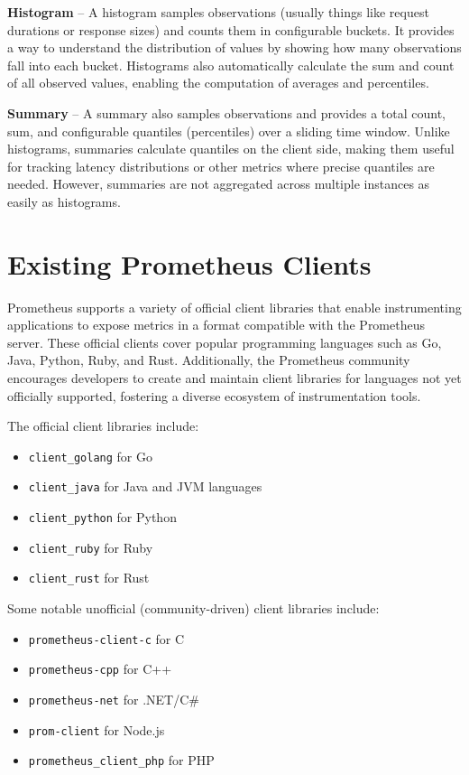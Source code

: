 \textbf{Histogram} – A histogram samples observations (usually things like request durations or response sizes) and counts them in configurable buckets.
It provides a way to understand the distribution of values by showing how many observations fall into each bucket.
Histograms also automatically calculate the sum and count of all observed values, enabling the computation of averages and percentiles.

\textbf{Summary} – A summary also samples observations and provides a total count, sum, and configurable quantiles (percentiles) over a sliding time window.
Unlike histograms, summaries calculate quantiles on the client side, making them useful for tracking latency distributions or other metrics where precise quantiles are needed.
However, summaries are not aggregated across multiple instances as easily as histograms.


\section{Existing Prometheus Clients}\label{sec:existing-prometheus-clients}

Prometheus supports a variety of official client libraries that enable instrumenting applications to expose
metrics in a format compatible with the Prometheus server.
These official clients cover popular programming languages such as Go, Java, Python, Ruby, and Rust.
Additionally, the Prometheus community encourages developers to create and maintain client libraries for languages not yet officially supported, fostering a diverse ecosystem of instrumentation tools.

The official client libraries include:
\begin{itemize}
    \item \texttt{client\_golang} for Go
    \item \texttt{client\_java} for Java and \ac{JVM} languages
    \item \texttt{client\_python} for Python
    \item \texttt{client\_ruby} for Ruby
    \item \texttt{client\_rust} for Rust
\end{itemize}

Some notable unofficial (community-driven) client libraries include:
\begin{itemize}
    \item \texttt{prometheus-client-c} for C
    \item \texttt{prometheus-cpp} for C++
    \item \texttt{prometheus-net} for .NET/C\#
    \item \texttt{prom-client} for Node.js
    \item \texttt{prometheus\_client\_php} for PHP
\end{itemize}

